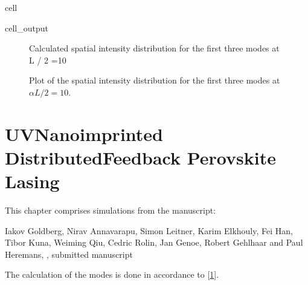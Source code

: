 \documentclass[a4paper,10pt,english,openany,oneside]{jupyterBook}
\begin{document}
\begin{sphinxuseclass}{cell}\begin{sphinxVerbatimOutput}

\begin{sphinxuseclass}{cell_output}
\begin{figure}[htbp]
\centering
\capstart

\noindent{}
\caption{Calculated spatial intensity distribution for the first three modes at  L / 2 =10}\label{\detokenize{Kogelnik-Shank_Coupled-Wave-Theory_DFB-Lasers:kogelnik12dc}}\end{figure}

\end{sphinxuseclass}\end{sphinxVerbatimOutput}

\end{sphinxuseclass}
\begin{figure}[htbp]
\centering
\capstart

\noindent{}
\caption{Plot of the spatial intensity distribution for the first three modes at \(\alpha L / 2 =10\).}\label{\detokenize{Kogelnik-Shank_Coupled-Wave-Theory_DFB-Lasers:kogelnik12d}}\end{figure}

\sphinxstepscope


\chapter{UV\sphinxhyphen{}Nanoimprinted Distributed\sphinxhyphen{}Feedback Perovskite Lasing}
\label{\detokenize{NanoimprintedDFB:uv-nanoimprinted-distributed-feedback-perovskite-lasing}}\label{\detokenize{NanoimprintedDFB::doc}}
\sphinxAtStartPar
This chapter comprises simulations from the manuscript:

\sphinxAtStartPar
Iakov Goldberg, Nirav Annavarapu, Simon Leitner, Karim Elkhouly, Fei Han, Tibor Kuna, Weiming Qiu, Cedric Rolin, Jan Genoe, Robert Gehlhaar and Paul Heremans, , submitted manuscript

\sphinxAtStartPar
The calculation of the modes is done in accordance to {[}\hyperlink{cite.bib:id3}{1}{]}.
\end{document}
